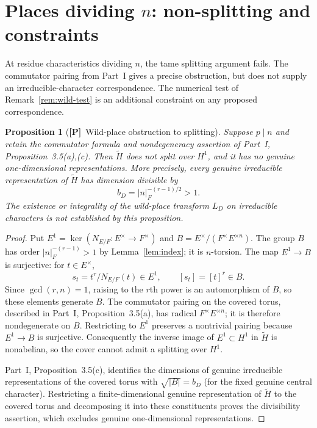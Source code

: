 \documentclass[11pt]{article}
\newcommand{\tH}{\widetilde H}
\newcommand{\Ptag}{\textnormal{\textbf{[P]}}}
\theoremstyle{plain}
\newtheorem{proposition}[theorem]{Proposition}
\theoremstyle{definition}
\begin{document}
\section{Places dividing \texorpdfstring{$n$}{n}: non-splitting and constraints}\label{sec:wild}
At residue characteristics dividing $n$, the tame splitting
argument fails. The commutator pairing from Part~I gives a precise
obstruction, but does not supply an irreducible-character
correspondence. The numerical test of Remark~\ref{rem:wild-test}
is an additional constraint on any proposed correspondence.

\begin{proposition}[\Ptag\ Wild-place obstruction to splitting]\label{prop:wild-obstruction}
Suppose $p\mid n$ and retain the commutator formula and
nondegeneracy assertion of Part~I, Proposition~3.5(a),(c).
Then $\tH$ does not split over $H^1$, and it has no genuine
one-dimensional representations. More precisely, every genuine irreducible
representation of $\tH$ has dimension divisible by
\[
 b_D=|n|_F^{-(r-1)/2}>1.
\]
The existence or integrality of the wild-place transform $L_D$
on irreducible characters is not established by this proposition.
\end{proposition}
\begin{proof}
Put $E^1=\ker(N_{E/F}:E^\times\to F^\times)$ and
$B=E^\times/(F^\times E^{\times n})$. The group $B$ has
order $|n|_F^{-(r-1)}>1$ by Lemma~\ref{lem:index}; it is
$n$-torsion. The map $E^1\to B$ is surjective: for $t\in E^\times$,
\[
 s_t=t^r/N_{E/F}(t)\in E^1,
\qquad [s_t]=[t]^r\in B.
\]
Since $\gcd(r,n)=1$, raising to the $r$th power is an
automorphism of $B$, so these elements generate $B$.
The commutator pairing on the covered torus, described in
Part~I, Proposition~3.5(a), has radical
$F^\times E^{\times n}$; it is therefore nondegenerate on
$B$. Restricting to $E^1$ preserves a nontrivial pairing
because $E^1\to B$ is surjective. Consequently the
inverse image of $E^1\subset H^1$ in $\tH$ is nonabelian,
so the cover cannot admit a splitting over $H^1$.

Part~I, Proposition~3.5(c), identifies the dimensions of
genuine irreducible representations of the covered torus
with $\sqrt{|B|}=b_D$ (for the fixed genuine central
character). Restricting a finite-dimensional genuine
representation of $\tH$ to the covered torus and decomposing
it into these constituents proves the divisibility assertion,
which excludes genuine one-dimensional representations.
\end{proof}
\end{document}
